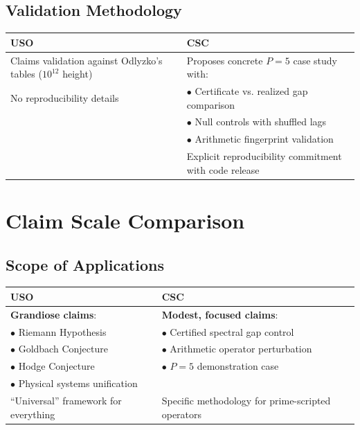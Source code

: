 \documentclass[10pt]{article}
\begin{document}
\subsection*{Validation Methodology}

\begin{table}[h!]
\centering
\begin{tabular}{L{6cm}L{6cm}}
\toprule
\textcolor{usored}{\textbf{USO}} & \textcolor{cscgreen}{\textbf{CSC}} \\
\midrule
Claims validation against Odlyzko's tables ($10^{12}$ height) & Proposes concrete $P=5$ case study with: \\
No reproducibility details & \quad $\bullet$ Certificate vs. realized gap comparison \\
& \quad $\bullet$ Null controls with shuffled lags \\
& \quad $\bullet$ Arithmetic fingerprint validation \\
& Explicit reproducibility commitment with code release \\
\bottomrule
\end{tabular}
\end{table}

\section*{Claim Scale Comparison}

\subsection*{Scope of Applications}

\begin{table}[h!]
\centering
\begin{tabular}{L{6cm}L{6cm}}
\toprule
\textcolor{usored}{\textbf{USO}} & \textcolor{cscgreen}{\textbf{CSC}} \\
\midrule
\textbf{Grandiose claims}: & \textbf{Modest, focused claims}: \\
\quad $\bullet$ Riemann Hypothesis & \quad $\bullet$ Certified spectral gap control \\
\quad $\bullet$ Goldbach Conjecture & \quad $\bullet$ Arithmetic operator perturbation \\
\quad $\bullet$ Hodge Conjecture & \quad $\bullet$ $P=5$ demonstration case \\
\quad $\bullet$ Physical systems unification & \\
``Universal'' framework for everything & Specific methodology for prime-scripted operators \\
\bottomrule
\end{tabular}
\end{table}
\end{document}
